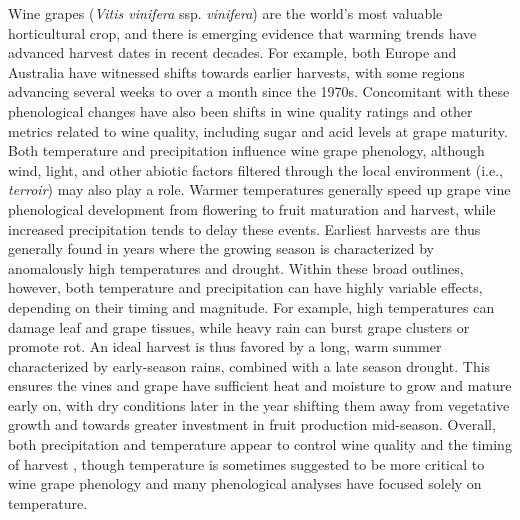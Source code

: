 \documentclass{nature}
\begin{document}
\noindent Wine grapes (\emph{Vitis vinifera} ssp. \emph{vinifera}) are the world's most valuable horticultural crop, and there is emerging evidence that warming trends have advanced harvest dates in recent decades. For example, both Europe\cite{Jones:2000br,schultzjones,tomasi2011,odo2012} and Australia\cite{webb2012} have witnessed shifts towards earlier harvests, with some regions advancing several weeks to over a month since the 1970s\cite{Duchene:2005bd,Seguin2005,webb2011}. Concomitant with these phenological changes have also been shifts in wine quality ratings\cite{jones2005} and other metrics related to wine quality\cite{mori2007}, including sugar and acid levels at grape maturity\cite{Jones:2000br}.\\
\indent Both temperature and precipitation influence wine grape phenology, although wind, light, and other abiotic factors filtered through the local environment (i.e., \emph{terroir}) may also play a role\cite{Gladstones2011}. Warmer temperatures generally speed up grape vine phenological development from flowering to fruit maturation and harvest, while increased precipitation tends to delay these events\cite{jones2013}. Earliest harvests are thus generally found in years where the growing season is characterized by anomalously high temperatures and drought\cite{Jones:2000br}. Within these broad outlines, however, both temperature and precipitation can have highly variable effects, depending on their timing and magnitude. For example, high temperatures can damage leaf and grape tissues\cite{greer2010,Gladstones2011}, while heavy rain can burst grape clusters or promote rot\cite{jones2013}. An ideal harvest is thus favored by a long, warm summer characterized by early-season rains, combined with a late season drought. This ensures the vines and grape have sufficient heat and moisture to grow and mature early on, with dry conditions later in the year shifting them away from vegetative growth and towards greater investment in fruit production mid-season\cite{chaves2010,jones2013,baciocco2014}. Overall, both precipitation \cite{vanlee2009} and temperature \cite{baciocco2014} appear to control wine quality and the timing of harvest \cite{odo2012,webb2012}, though temperature is sometimes suggested to be more critical to wine grape phenology\cite{coombe1987} and many phenological analyses have focused solely on temperature\cite{jones2005}.\\
\end{document}
